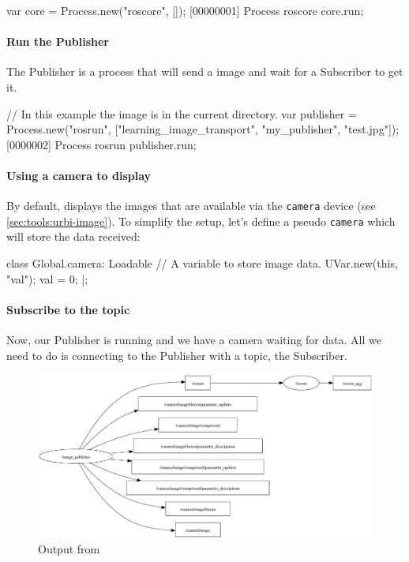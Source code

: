 \begin{urbiunchecked}
var core = Process.new("roscore", []);
[00000001] Process roscore
core.run;
\end{urbiunchecked}


\paragraph{Run the Publisher}
The Publisher is a process that will send a image and wait for a Subscriber
to get it.

\begin{urbiunchecked}
// In this example the image is in the current directory.
var publisher =
  Process.new("rosrun",
              ["learning_image_transport", "my_publisher", "test.jpg"]);
[0000002] Process rosrun
publisher.run;
\end{urbiunchecked}

\paragraph{Using a camera to display}
By default,  displays the images that are available via
the \lstinline{camera} device (see \autoref{sec:tools:urbi-image}).  To
simplify the setup, let's define a pseudo \lstinline{camera} which will
store the data received:

\begin{urbiunchecked}
class Global.camera: Loadable
{
  // A variable to store image data.
  UVar.new(this, "val");
  val = 0;
}|;
\end{urbiunchecked}


\paragraph{Subscribe to the topic}
Now, our Publisher is running and we have a camera waiting for data.  All we
need to do is connecting to the Publisher with a topic, the Subscriber.

\begin{figure}[htp]
  \centering
  \includegraphics[width=0.9\linewidth]{img/ros-image-publisher}
  \caption{Output from }
  \label{fig:ros:img-pub}
\end{figure}

